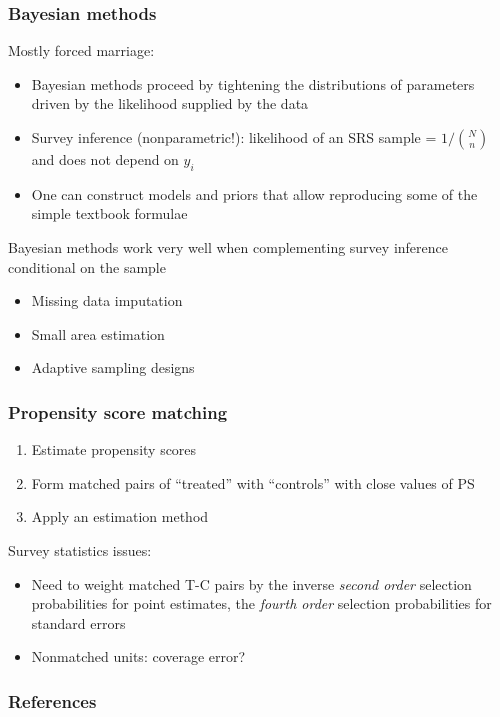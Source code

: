 \documentclass{beamer}
\begin{document}
\begin{frame}\frametitle{Bayesian methods}

Mostly forced marriage:
\begin{itemize}
    \item Bayesian methods proceed by tightening the distributions of parameters
        driven by the likelihood supplied by the data
    \item Survey inference (nonparametric!): likelihood of an SRS sample = $1/{N \choose n}$ and does not depend on $y_i$
    \item One can construct models and priors that allow reproducing some of the simple
        textbook formulae \citep{little:2012}
\end{itemize}

Bayesian methods work very well when complementing survey inference conditional on the sample
\begin{itemize}
    \item Missing data imputation
    \item Small area estimation
    \item Adaptive sampling designs
\end{itemize}

\end{frame}

\begin{frame}\frametitle{Propensity score matching}

\begin{enumerate}
    \item Estimate propensity scores
    \item Form matched pairs of ``treated'' with ``controls'' with close values of PS
    \item Apply an estimation method
\end{enumerate}

\medskip

Survey statistics issues:

\begin{itemize}
    \item Need to weight matched T-C pairs by the inverse
        \textit{second order} selection probabilities for point estimates,
        the \textit{fourth order} selection probabilities for standard errors
    \item Nonmatched units: coverage error?
\end{itemize}

\end{frame}



\begin{frame}[allowframebreaks]\frametitle{References}




\end{frame}
\end{document}
